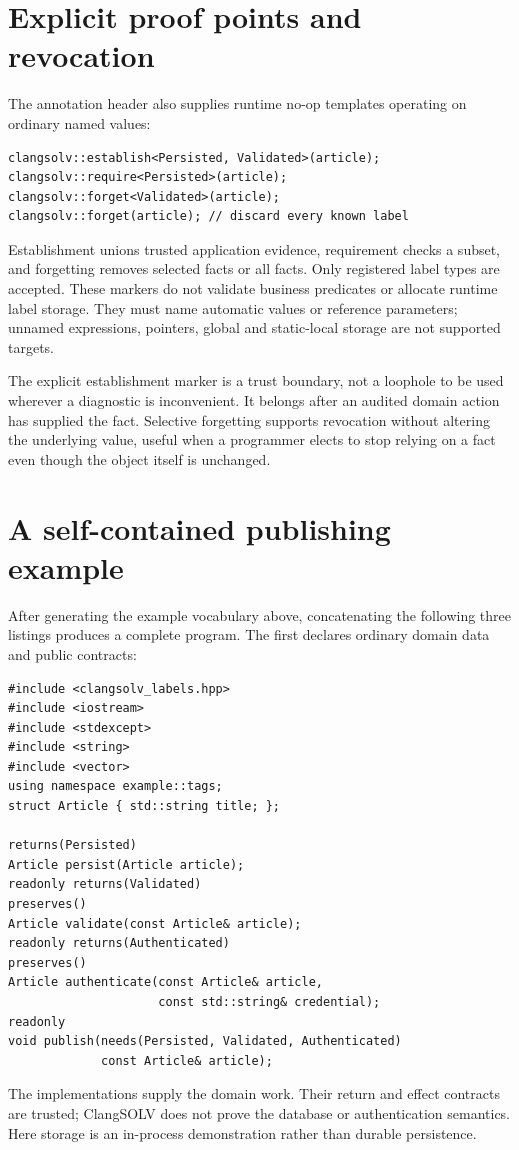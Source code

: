 \documentclass[11pt]{article}
\begin{document}
\section{Explicit proof points and revocation}
The annotation header also supplies runtime no-op templates operating on
ordinary named values:
\begin{lstlisting}
clangsolv::establish<Persisted, Validated>(article);
clangsolv::require<Persisted>(article);
clangsolv::forget<Validated>(article);
clangsolv::forget(article); // discard every known label
\end{lstlisting}
Establishment unions trusted application evidence, requirement checks a subset,
and forgetting removes selected facts or all facts. Only registered label
types are accepted. These markers do not validate business predicates or
allocate runtime label storage. They must name automatic values or reference
parameters; unnamed expressions, pointers, global and static-local storage are
not supported targets.

The explicit establishment marker is a trust boundary, not a loophole to be
used wherever a diagnostic is inconvenient. It belongs after an audited
domain action has supplied the fact. Selective forgetting supports revocation
without altering the underlying value, useful when a programmer elects to
stop relying on a fact even though the object itself is unchanged.

\section{A self-contained publishing example}
After generating the example vocabulary above, concatenating the following
three listings produces a complete program. The first declares ordinary
domain data and public contracts:
\begin{lstlisting}
#include <clangsolv_labels.hpp>
#include <iostream>
#include <stdexcept>
#include <string>
#include <vector>
using namespace example::tags;
struct Article { std::string title; };

returns(Persisted)
Article persist(Article article);
readonly returns(Validated)
preserves()
Article validate(const Article& article);
readonly returns(Authenticated)
preserves()
Article authenticate(const Article& article,
                     const std::string& credential);
readonly
void publish(needs(Persisted, Validated, Authenticated)
             const Article& article);
\end{lstlisting}
The implementations supply the domain work. Their return and effect contracts
are trusted; ClangSOLV does not prove the database or authentication semantics.
Here storage is an in-process demonstration rather than durable persistence.
\end{document}
